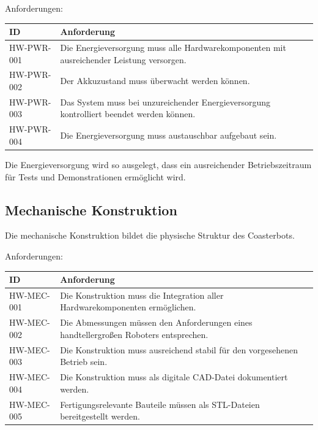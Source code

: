 Anforderungen:

\begin{longtable}[]{@{}
  >{\raggedright\arraybackslash}p{}
  >{\raggedright\arraybackslash}p{}@{}}
\toprule\noalign{}
\begin{minipage}[b]{\linewidth}\raggedright
ID
\end{minipage} & \begin{minipage}[b]{\linewidth}\raggedright
Anforderung
\end{minipage} \\
\midrule\noalign{}
\endhead
\bottomrule\noalign{}
\endlastfoot
HW-PWR-001 & Die Energieversorgung muss alle Hardwarekomponenten mit
ausreichender Leistung versorgen. \\
HW-PWR-002 & Der Akkuzustand muss überwacht werden können. \\
HW-PWR-003 & Das System muss bei unzureichender Energieversorgung
kontrolliert beendet werden können. \\
HW-PWR-004 & Die Energieversorgung muss austauschbar aufgebaut sein. \\
\end{longtable}

Die Energieversorgung wird so ausgelegt, dass ein ausreichender
Betriebszeitraum für Tests und Demonstrationen ermöglicht wird.

\subsection{Mechanische Konstruktion}\label{mechanische-konstruktion}

Die mechanische Konstruktion bildet die physische Struktur des
Coasterbots.

Anforderungen:

\begin{longtable}[]{@{}
  >{\raggedright\arraybackslash}p{}
  >{\raggedright\arraybackslash}p{}@{}}
\toprule\noalign{}
\begin{minipage}[b]{\linewidth}\raggedright
ID
\end{minipage} & \begin{minipage}[b]{\linewidth}\raggedright
Anforderung
\end{minipage} \\
\midrule\noalign{}
\endhead
\bottomrule\noalign{}
\endlastfoot
HW-MEC-001 & Die Konstruktion muss die Integration aller
Hardwarekomponenten ermöglichen. \\
HW-MEC-002 & Die Abmessungen müssen den Anforderungen eines
handtellergroßen Roboters entsprechen. \\
HW-MEC-003 & Die Konstruktion muss ausreichend stabil für den
vorgesehenen Betrieb sein. \\
HW-MEC-004 & Die Konstruktion muss als digitale CAD-Datei dokumentiert
werden. \\
HW-MEC-005 & Fertigungsrelevante Bauteile müssen als STL-Dateien
bereitgestellt werden. \\
\end{longtable}

